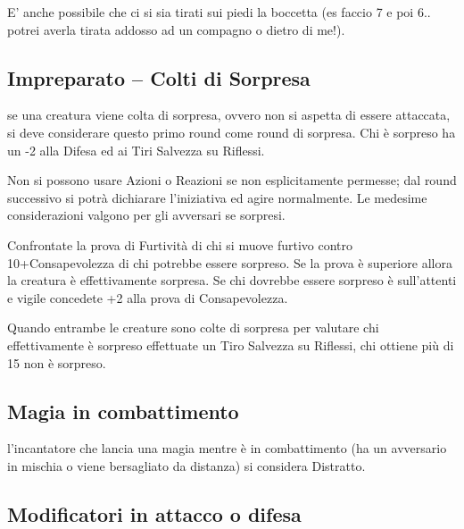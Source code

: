 \begin{multicols}{2}
E' anche possibile che ci si sia tirati sui piedi la boccetta (es faccio 7 e poi 6.. potrei averla tirata addosso ad un compagno o dietro di me!).

\subsection{Impreparato -- Colti di Sorpresa}\label{coltidisorpresa}\hypertarget{sorpresa}{}

se una creatura viene colta di sorpresa, ovvero non si aspetta di essere attaccata, si deve considerare questo primo round come round di sorpresa. Chi è sorpreso ha un -2 alla Difesa ed ai Tiri Salvezza su Riflessi.

Non si possono usare Azioni o Reazioni se non esplicitamente permesse; dal round successivo si potrà dichiarare l'iniziativa ed agire normalmente. Le medesime considerazioni valgono per gli avversari se sorpresi.

Confrontate la prova di Furtività di chi si muove furtivo contro 10+Consapevolezza di chi potrebbe essere sorpreso. Se la prova è superiore allora la creatura è effettivamente sorpresa. Se chi dovrebbe essere sorpreso è sull'attenti e vigile concedete +2 alla prova di Consapevolezza.

Quando entrambe le creature sono colte di sorpresa per valutare chi effettivamente è sorpreso effettuate un Tiro Salvezza su Riflessi, chi ottiene più di 15 non è sorpreso.

\subsection{Magia in combattimento}\label{magiaincombattimento}

l'incantatore che lancia una magia mentre è in combattimento (ha un avversario in mischia o viene bersagliato da distanza) si considera Distratto.

%

\subsection{Modificatori in attacco o difesa} \label{modificatoriattaccodifesaparticolari}


\end{multicols}
